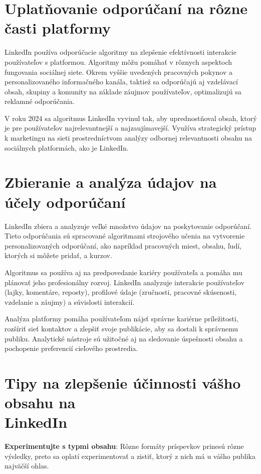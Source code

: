 \documentclass[slovak,a4paper]{coursepaper}
\begin{document}
\section{Uplatňovanie odporúčaní na rôzne časti platformy} \label{Uplatňovanie}
LinkedIn používa odporúčacie algoritmy na zlepšenie efektívnosti interakcie používateľov s platformou.
Algoritmy môžu pomáhať v rôznych aspektoch fungovania sociálnej siete.
Okrem vyššie uvedených pracovných pokynov a personalizovaného informačného kanála, taktiež sa odporúčajú aj vzdelávací obsah, skupiny a komunity na základe záujmov používateľov, optimalizujú sa reklamné odporúčania.

V roku 2024 sa algoritmus LinkedIn vyvinul tak, aby uprednostňoval obsah, ktorý je pre používateľov najrelevantnejší a najzaujímavejší.
Využíva strategický prístup k marketingu na sieti prostredníctvom analýzy odbornej relevantnosti obsahu na sociálnych platformách, ako je LinkedIn.~\cite{11}


\section{Zbieranie a analýza údajov na účely odporúčaní} \label{analýza údajov}
LinkedIn zbiera a analyzuje veľké množstvo údajov na poskytovanie odporúčaní. Tieto odporúčania sú spracované algoritmami strojového učenia na vytvorenie personalizovaných odporúčaní, ako napríklad pracovných miest, obsahu, ľudí, ktorých si môžete pridať, a kurzov.

Algoritmus sa používa aj na predpovedanie kariéry používateľa a pomáha mu plánovať jeho profesionálny rozvoj. LinkedIn analyzuje interakcie používateľov (lajky, komentáre, reposty), profilové údaje (zručnosti, pracovné skúsenosti, vzdelanie a záujmy) a súvislosti interakcií.~\cite{8}

Analýza platformy pomáha používateľom nájsť správne kariérne príležitosti, rozšíriť sieť kontaktov a zlepšiť svoje publikácie, aby sa dostali k správnemu publiku. Analytické nástroje sú užitočné aj na sledovanie úspešnosti obsahu a pochopenie preferencií cieľového prostredia.

\section{\texorpdfstring{Tipy na zlepšenie účinnosti vášho obsahu na \\ LinkedIn}{Tipy na zlepšenie účinnosti vášho obsahu na LinkedIn}}
\label{Tipy}

\textbf{Experimentujte s typmi obsahu}: Rôzne formáty príspevkov prinesú rôzne výsledky, preto sa oplatí experimentovať a zistiť, ktorý z nich má u vášho publika najväčší ohlas.
\end{document}
